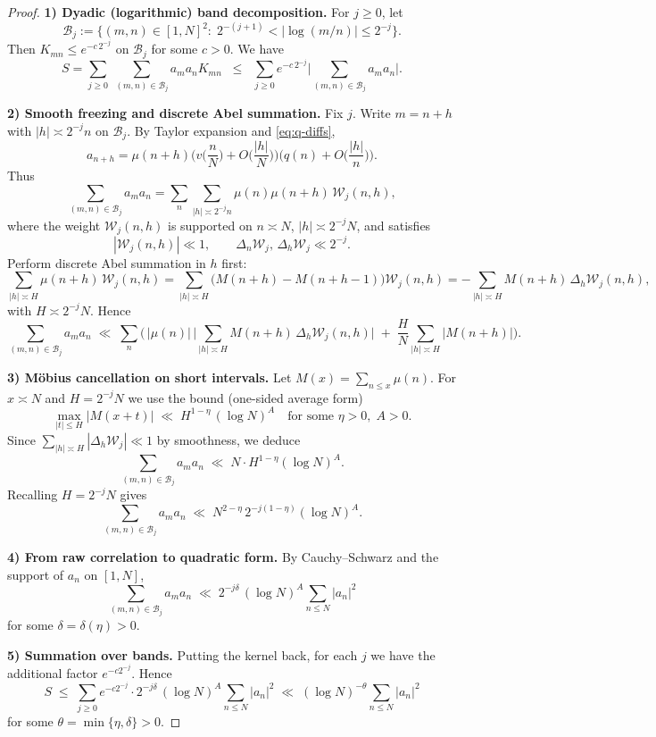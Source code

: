\documentclass[11pt]{article}
\theoremstyle{plain}
\begin{document}
\begin{proof}
\textbf{1) Dyadic (logarithmic) band decomposition.}
For $j\ge0$, let
\[
\mathcal{B}_j:=\Big\{(m,n)\in[1,N]^2:\;2^{-(j+1)}<|\log(m/n)|\le 2^{-j}\Big\}.
\]
Then $K_{mn}\le e^{-c\,2^{-j}}$ on $\mathcal{B}_j$ for some $c>0$. We have
\[
S=\sum_{j\ge0}\;\sum_{(m,n)\in\mathcal{B}_j} a_m a_n K_{mn}
\;\;\le\;\;\sum_{j\ge0} e^{-c\,2^{-j}}\Big|\sum_{(m,n)\in\mathcal{B}_j} a_m a_n\Big|.
\]

\textbf{2) Smooth freezing and discrete Abel summation.}
Fix $j$. Write $m=n+h$ with $|h|\asymp 2^{-j}n$ on $\mathcal{B}_j$. By Taylor expansion and \eqref{eq:q-diffs},
\[
a_{n+h}=\mu(n+h)\Big( v\!\Big(\frac{n}{N}\Big)+O\!\Big(\frac{|h|}{N}\Big) \Big)\Big(q(n)+O\!\Big(\frac{|h|}{n}\Big)\Big).
\]
Thus
\[
\sum_{(m,n)\in\mathcal{B}_j} a_m a_n
=\sum_{n}\sum_{|h|\asymp 2^{-j}n}\mu(n)\mu(n+h)\,\mathcal{W}_{j}(n,h),
\]
where the weight $\mathcal{W}_{j}(n,h)$ is supported on $n\asymp N$, $|h|\asymp 2^{-j}N$, and satisfies
\[
|\mathcal{W}_{j}(n,h)|\ll 1,\qquad
\Delta_n \mathcal{W}_{j},\,\Delta_h \mathcal{W}_{j}\ll 2^{-j}.
\]
Perform discrete Abel summation in $h$ first:
\[
\sum_{|h|\asymp H}\mu(n+h)\,\mathcal{W}_{j}(n,h)
=\sum_{|h|\asymp H}\big(M(n+h)-M(n+h-1)\big)\mathcal{W}_{j}(n,h)
=-\sum_{|h|\asymp H} M(n+h)\,\Delta_h \mathcal{W}_{j}(n,h),
\]
with $H\asymp 2^{-j}N$. Hence
\[
\sum_{(m,n)\in\mathcal{B}_j} a_m a_n
\;\ll\; \sum_n \Big(\,|\mu(n)|\,\Big|\sum_{|h|\asymp H} M(n+h)\,\Delta_h\mathcal{W}_{j}(n,h)\Big|
\;+\; \frac{H}{N}\sum_{|h|\asymp H}|M(n+h)|\Big).
\]

\textbf{3) M\"obius cancellation on short intervals.}
Let $M(x)=\sum_{n\le x}\mu(n)$. For $x\asymp N$ and $H=2^{-j}N$ we use the bound (one-sided average form)
\[
\max_{|t|\le H} |M(x+t)| \;\ll\; H^{1-\eta}\,(\log N)^{A}
\quad\text{for some } \eta>0,\;A>0.
\]
Since $\sum_{|h|\asymp H}|\Delta_h\mathcal{W}_{j}|\ll 1$ by smoothness, we deduce
\[
\sum_{(m,n)\in\mathcal{B}_j} a_m a_n \;\ll\; N\cdot H^{1-\eta}(\log N)^{A}.
\]
Recalling $H=2^{-j}N$ gives
\[
\sum_{(m,n)\in\mathcal{B}_j} a_m a_n \;\ll\; N^{2-\eta}\,2^{-j(1-\eta)}(\log N)^{A}.
\]

\textbf{4) From raw correlation to quadratic form.}
By Cauchy--Schwarz and the support of $a_n$ on $[1,N]$,
\[
\sum_{(m,n)\in\mathcal{B}_j} a_m a_n
\;\ll\; 2^{-j\delta}\,(\log N)^{A}\sum_{n\le N}|a_n|^2
\]
for some $\delta=\delta(\eta)>0$.

\textbf{5) Summation over bands.}
Putting the kernel back, for each $j$ we have the additional factor $e^{-c2^{-j}}$. Hence
\[
S\;\le\;\sum_{j\ge0} e^{-c2^{-j}}\cdot 2^{-j\delta}\,(\log N)^{A}\sum_{n\le N}|a_n|^2
\;\ll\; (\log N)^{-\theta}\sum_{n\le N}|a_n|^2
\]
for some $\theta=\min\{\eta,\delta\}>0$.
\end{proof}
\end{document}
